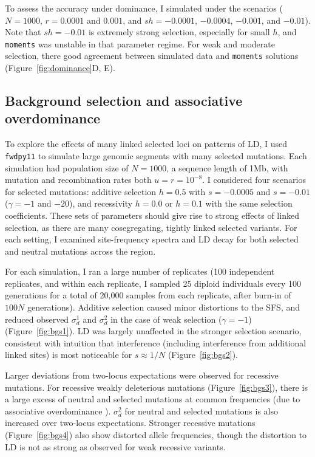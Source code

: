 \documentclass[]{article}
\begin{document}
To assess the accuracy under dominance, I simulated under the
\citet{Roze2021-cf} scenarios (\(N=1000\), \(r=0.0001\) and \(0.001\), and
\(sh=-0.0001\), \(-0.0004\), \(-0.001\), and \(-0.01\)). Note that \(sh=-0.01\)
is extremely strong selection, especially for small \(h\), and \texttt{moments}
was unstable in that parameter regime. For weak and moderate selection, there
good agreement between simulated data and \texttt{moments} solutions
(Figure~\ref{fig:dominance}D, E).

\subsection{Background selection and associative overdominance}\label{sec:bgs}

To explore the effects of many linked selected loci on patterns of LD, I used
\texttt{fwdpy11} \citep{Thornton2014-pn,Thornton2019-qc} to simulate large
genomic segments with many selected mutations. Each simulation had population
size of \(N=1000\), a sequence length of 1Mb, with mutation and recombination
rates both \(u=r=10^{-8}\). I considered four scenarios for selected mutations:
additive selection \(h=0.5\) with \(s=-0.0005\) and \(s=-0.01\) (\(\gamma=-1\)
and \(-20\)), and recessivity \(h=0.0\) or \(h=0.1\) with the same selection
coefficients. These sets of parameters should give rise to strong effects of
linked selection, as there are many cosegregating, tightly linked selected
variants. For each setting, I examined site-frequency spectra and LD decay for
both selected and neutral mutations across the region.

For each simulation, I ran a large number of replicates (100 independent
replicates, and within each replicate, I sampled 25 diploid individuals every
100 generations for a total of 20,000 samples from each replicate, after
burn-in of \(100N\) generations). Additive selection caused minor distortions
to the SFS, and reduced observed \(\sigma_d^1\) and \(\sigma_d^2\) in the case
of weak selection (\(\gamma=-1\)) (Figure~\ref{fig:bgs1}). LD was largely
unaffected in the stronger selection scenario, consistent with intuition that
interference (including interference from additional linked sites) is most
noticeable for \(s\approx1/N\) (Figure~\ref{fig:bgs2}).

Larger deviations from two-locus expectations were observed for recessive
mutations. For recessive weakly deleterious mutations (Figure~\ref{fig:bgs3}),
there is a large excess of neutral and selected mutations at common frequencies
(due to associative overdominance \citep{Zhao2016-bb}). \(\sigma_d^2\) for
neutral and selected mutations is also increased over two-locus expectations.
Stronger recessive mutations (Figure~\ref{fig:bgs4}) also show distorted allele
frequencies, though the distortion to LD is not as strong as observed for weak
recessive variants.
\end{document}
